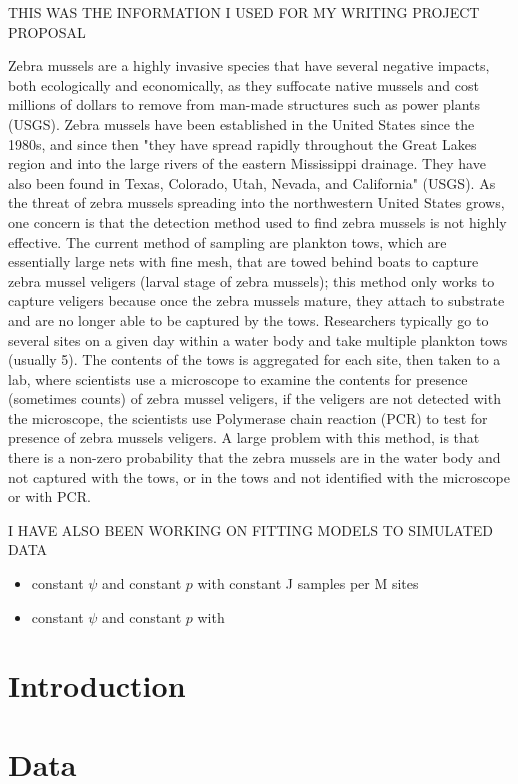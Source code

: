 \documentclass[12pt]{article}\usepackage[]{graphicx}\usepackage[]{color}
\begin{document}
THIS WAS THE INFORMATION I USED FOR MY WRITING PROJECT PROPOSAL

Zebra mussels are a highly invasive species that have several negative impacts, both ecologically and economically, as they suffocate native mussels and cost millions of dollars to remove from man-made structures such as power plants (USGS). Zebra mussels have been established in the United States since the 1980s, and since then "they have spread rapidly throughout the Great Lakes region and into the large rivers of the eastern Mississippi drainage. They have also been found in Texas, Colorado, Utah, Nevada, and California" (USGS). As the threat of zebra mussels spreading into the northwestern United States grows, one concern is that the detection method used to find zebra mussels is not highly effective. The current method of sampling are plankton tows, which are essentially large nets with fine mesh, that are towed behind boats to capture zebra mussel veligers (larval stage of zebra mussels); this method only works to capture veligers because once the zebra mussels mature, they attach to substrate and are no longer able to be captured by the tows. Researchers typically go to several sites on a given day within a water body and take multiple plankton tows (usually 5). The contents of the tows is aggregated for each site, then taken to a lab, where scientists use a microscope to examine the contents for presence (sometimes counts) of zebra mussel veligers, if the veligers are not detected with the microscope, the scientists use Polymerase chain reaction (PCR) to  test for presence of zebra mussels veligers. A large problem with this method, is that there is a non-zero probability that the zebra mussels are in the water body and not captured with the tows, or in the tows and not identified with the microscope or with PCR. 

I HAVE ALSO BEEN WORKING ON FITTING MODELS TO SIMULATED DATA 

\begin{itemize}
\item constant $\psi$ and constant $p$ with constant J samples per M sites 
\item constant $\psi$ and constant $p$ with 
\end{itemize}


\section{Introduction}


\section{Data}
\end{document}
